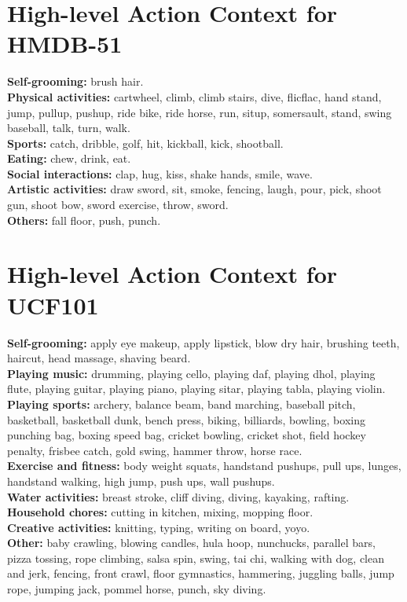 \documentclass{article} \usepackage{iclr2024_conference,times}
\begin{document}
\section{High-level Action Context for HMDB-51}
\label{High-level Action Context for HMDB-51}
\selectfont
\textbf{Self-grooming:} \lowercase{brush hair.}\\
\textbf{Physical activities:} \lowercase{Cartwheel, Climb, Climb stairs, Dive, Flicflac, Hand stand, Jump, Pullup, Pushup, Ride bike, Ride horse, Run, Situp, Somersault, Stand, Swing baseball, Talk, Turn, Walk.}\\
\textbf{Sports:} \lowercase{Catch, Dribble, Golf, Hit, Kickball, Kick, Shootball.}\\
\textbf{Eating:} \lowercase{Chew, Drink, Eat.}\\
\textbf{Social interactions:} \lowercase{Clap, Hug, Kiss, Shake hands, Smile, Wave.}\\
\textbf{Artistic activities:} \lowercase{Draw sword, Sit, Smoke, Fencing, Laugh, Pour, Pick, Shoot gun, Shoot bow, Sword exercise, Throw, Sword.}\\
\textbf{Others:} \lowercase{fall floor, push, punch.}

\section{High-level Action Context for UCF101}
\label{High-level Action Context for UCF101}
\selectfont

\textbf{Self-grooming:}  \lowercase{Apply Eye Makeup, Apply Lipstick, Blow Dry Hair, Brushing Teeth, Haircut, Head Massage, Shaving Beard.}\\
\textbf{Playing music:} \lowercase{Drumming, Playing Cello, Playing Daf, Playing Dhol, Playing Flute, Playing Guitar, Playing Piano, Playing Sitar, Playing Tabla, Playing Violin.}\\
\textbf{Playing sports:} \lowercase{Archery, Balance Beam, Band Marching, Baseball Pitch, Basketball, Basketball Dunk, Bench Press, Biking, Billiards, Bowling, Boxing Punching Bag, Boxing Speed Bag, Cricket Bowling, Cricket Shot, Field Hockey Penalty, Frisbee Catch, Gold Swing, Hammer Throw, Horse Race.}\\
\textbf{Exercise and fitness:} \lowercase{Body Weight Squats, Handstand Pushups, Pull Ups, Lunges, Handstand Walking, High Jump, Push Ups, Wall Pushups.}\\
\textbf{Water activities:} \lowercase{Breast Stroke, Cliff Diving, Diving, Kayaking, Rafting.}\\
\textbf{Household chores:} \lowercase{Cutting In Kitchen, Mixing, Mopping Floor.}\\ 
\textbf{Creative activities:} \lowercase{Knitting, Typing, Writing On Board, YoYo.}\\
\textbf{Other:} \lowercase{Baby Crawling, Blowing Candles, Hula Hoop, Nunchucks, Parallel Bars, Pizza Tossing, Rope Climbing, Salsa Spin, Swing, Tai Chi, Walking With Dog, Clean And Jerk, Fencing, Front Crawl, Floor Gymnastics, Hammering, Juggling Balls, Jump Rope, Jumping Jack, Pommel Horse, Punch, Sky Diving.}
\end{document}
